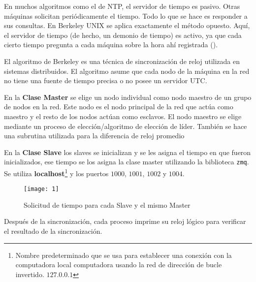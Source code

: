 En muchos algoritmos como el de NTP, el servidor de tiempo es pasivo. Otras
máquinas solicitan periódicamente el tiempo. Todo lo que se hace es responder a
sus consultas. En Berkeley UNIX se aplica exactamente el método opuesto.
Aquí, el servidor de tiempo (de hecho, un demonio de tiempo) es activo, ya que
cada cierto tiempo pregunta a cada máquina sobre la hora ahí registrada
(\cite{TSO}).

El algoritmo de Berkeley es una técnica de sincronización de reloj utilizada en
sistemas distribuidos. El algoritmo asume que cada nodo de la máquina en la red
no tiene una fuente de tiempo precisa o no posee un servidor UTC.\@

En la \textbf{Clase Master} se elige un nodo individual como nodo maestro de un
grupo de nodos en la red. Este nodo es el nodo principal de la red que actúa
como maestro y el resto de los nodos actúan como esclavos. El nodo maestro se
elige mediante un proceso de elección/algoritmo de elección de líder.
También se hace una subrutina utilizada para la diferencia de reloj
promedio

En la \textbf{Clase Slave} los slaves se inicializan y se les asigna el tiempo
en que fueron inicializados, ese tiempo se los asigna la clase master utilizando
la biblioteca \texttt{zmq}.
Se utiliza \textbf{localhost}\footnote{Nombre predeterminado que se usa para establecer
  una conexión con la computadora local computadora usando la red de dirección
  de bucle invertido. $127.0.0.1$} y los puertos $1000$, $1001$, $1002$ y $1004$.

\begin{figure}[H]
  \centering
  \texttt{[image: 1]}
  \caption{Solicitud de tiempo para cada Slave y el mismo Master}\label{fig:1}
\end{figure}

Después de la sincronización, cada proceso imprime su reloj lógico para
verificar el resultado de la sincronización.

